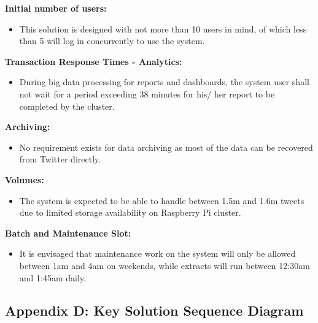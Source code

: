 \documentclass[12pt]{article} %
\begin{document}
	\textbf{Initial number of users:}
	
	\begin{itemize}
		\item This solution is designed with not more than 10 users in mind, of which less than 5 will log in concurrently to use the system.
	\end{itemize}
	
		\textbf{Transaction Response Times - Analytics:}
		
		\begin{itemize}
			\item During big data processing for reports and dashboards, the system user shall not wait for a period exceeding 38 minutes for his/ her report to be completed by the cluster.
		\end{itemize}
	
		\textbf{Archiving:}
		
		\begin{itemize}
			\item No requirement exists for data archiving as most of the data can be recovered from Twitter directly.
		\end{itemize}
		
		\textbf{Volumes:}
			
		\begin{itemize}
			\item The system is expected to be able to handle between 1.5m and 1.6m tweets due to limited storage availability on Raspberry Pi cluster.
		\end{itemize}
	
		\textbf{Batch and Maintenance Slot:}
		
		\begin{itemize}
			\item It is envisaged that maintenance work on the system will only be allowed between 1am and 4am on weekends, while extracts will run between 12:30am and 1:45am daily.
		\end{itemize}
	
	\newpage
	
	\subsection{Appendix D: Key Solution Sequence Diagram}
		
\end{document}
